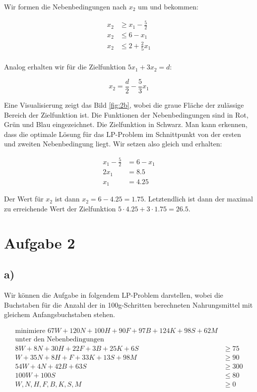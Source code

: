 \documentclass{article}
\begin{document}
Wir formen die Nebenbedingungen nach $x_2$ um und bekommen:

\begin{align*}
	x_2 &\geq x_1 - \frac{5}{2}\\
	x_2 &\leq 6 - x_1\\
	x_2 &\leq 2 + \frac{2}{5}x_1\\
\end{align*}

Analog erhalten wir für die Zielfunktion $5x_1 + 3x_2 = d$:

$$x_2 = \frac{d}{2} - \frac{5}{3}x_1$$

Eine Visualisierung zeigt das Bild \ref{fig:2b}, wobei die graue Fläche der zulässige Bereich der Zielfunktion ist. Die Funktionen der Nebenbedingungen sind in Rot, Grün und Blau eingezeichnet. Die Zielfunktion in Schwarz. Man kann erkennen, dass die optimale Lösung für das LP-Problem im Schnittpunkt von der ersten und zweiten Nebenbedingung liegt. Wir setzen also gleich und erhalten:

\begin{align*}
	x_1 - \frac{5}{2} &= 6 - x_1\\
	2x_1 &= 8.5\\
	x_1 &= 4.25
\end{align*}

Der Wert für $x_2$ ist dann $x_2 = 6 - 4.25 = 1.75$. Letztendlich ist dann der maximal zu erreichende Wert der Zielfunktion $5 \cdot 4.25 + 3 \cdot 1.75 = 26.5$.





\section*{Aufgabe 2}
\subsection*{a)}
Wir können die Aufgabe in folgendem LP-Problem darstellen, wobei die Buchstaben für die Anzahl der in 100g-Schritten berechneten Nahrungsmittel mit gleichem Anfangsbuchstaben stehen.

\begin{align*}
	\text{minimiere } 67W + 120N + 100H + 90F + 97B + 124K + 98S + 62M\\
	\text{unter den Nebenbedingungen}\\
	8W + 8N + 30H + 22F + 3B + 25K + 6S &\geq 75\\
	W + 35N + 8H + F + 33K + 13S + 98M &\geq 90\\
	54W + 4N + 42B + 63S &\geq 300\\
	100W + 100S &\leq 80\\
	W, N, H, F, B, K, S, M &\geq 0
\end{align*}
\end{document}
